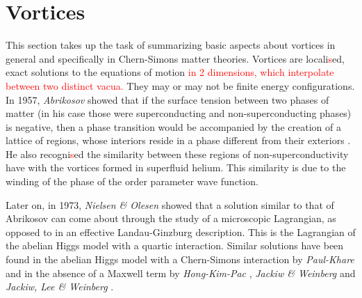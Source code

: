         \section{Vortices} \label{vortices_sec}
        This section takes up the task of summarizing basic aspects about vortices in general and specifically in Chern-Simons matter theories.
        Vortices are locali\textcolor{red}{s}ed, exact solutions to the equations of motion \textcolor{red}{ in 2 dimensions, which interpolate between two distinct vacua.}  They may or may not be finite energy configurations.
        In 1957, \textit{Abrikosov}  showed that if the surface tension between two phases of matter (in his case those were superconducting and non-superconducting phases) is negative, then a phase transition would be accompanied by the creation of a lattice of regions, whose interiors reside in a phase different from their exteriors \cite{Abrikosov1957}. He also recogni\textcolor{red}{s}ed the similarity between these regions of non-superconductivity have with the vortices formed in superfluid helium. This similarity is due to the winding of the phase of the order parameter wave function.


        Later on, in 1973, \textit{Nielsen \& Olesen} \cite{Nielsen:1973cs} showed that a solution similar to that of Abrikosov can come about through the study of a microscopic Lagrangian, as opposed to in an effective Landau-Ginzburg description. This is the Lagrangian of the abelian Higgs model with a quartic interaction. Similar solutions have been found in the abelian Higgs model with a Chern-Simons interaction by \textit{Paul-Khare} \cite{Paul:1986ix} and in the absence of a Maxwell term by \textit{Hong-Kim-Pac} \cite{Hong:1990yh}, \textit{Jackiw \& Weinberg} \cite{Jackiw:1990aw} and \textit{Jackiw, Lee \& Weinberg} \cite{Jackiw:1990pr}.

